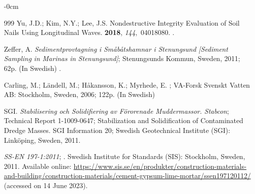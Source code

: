 \documentclass[sustainability,article,accept,pdftex,moreauthors]{Definitions/mdpi}
\begin{document}
{{\begin{adjustwidth}{-\extralength}{0cm}
\begin{thebibliography}{999}
Yu, J.D.; Kim, N.Y.; Lee, J.S.
\newblock Nondestructive Integrity Evaluation of Soil Nails Using Longitudinal
  Waves.
 {\bf
  2018}, {\em 144},~04018080.
.

Zeffer, A. %
 \emph{Sedimentprovtagning i Småbåtshamnar i Stenungsund [Sediment
  Sampling in Marinas in Stenungsund]};  
\newblock Stenungsunds Kommun, %
 Sweden, 2011;
\newblock  62p. (In Swedish)
.

Carling, M.; Ländell, M.; Håkansson, K.; Myrhede, E.
; {VA-Forsk Svenskt Vatten AB}: Stockholm, Sweden,
  2006;
\newblock 122p. (In Swedish) 

SGI.
\newblock \emph{Stabilisering och Solidifiering av Förorenade Muddermassor. Stabcon};
\newblock Technical Report 1-1009-0647; Stabilization and Solidification of Contaminated Dredge Masses. SGI  Information 20; %
 Swedish Geotechnical Institute (SGI):  Linköping, Sweden,  2011. 

\emph{SS-EN %
 197-1:2011};
. Swedish Institute for Standards (SIS): {Stockholm, Sweden,} 2011.
\newblock
  Available online: \url{https://www.sis.se/en/produkter/construction-materials-and-building/construction-materials/cement-gypsum-lime-mortar/ssen197120112/} (accessed on 14 June 2023). %



\end{thebibliography}
\end{adjustwidth}}}
\end{document}
